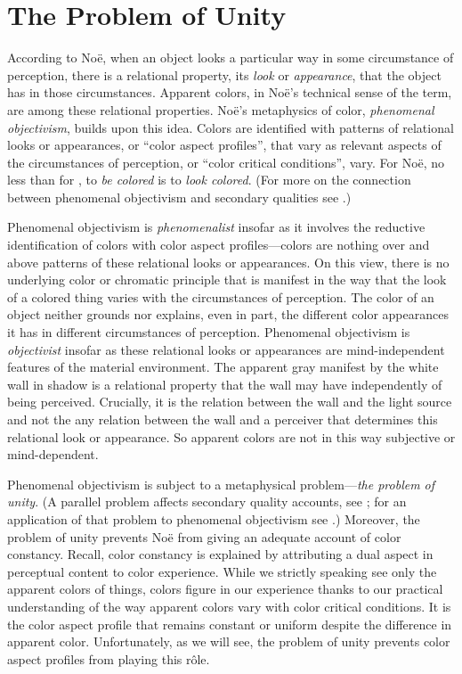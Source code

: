\documentclass[12pt]{article}
\begin{document}
\section{The Problem of Unity} %
\label{sec:the_problem_of_unity}

According to Noë, when an object looks a particular way in some circumstance of perception, there is a relational property, its \emph{look} or \emph{appearance}, that the object has in those circumstances. Apparent colors, in Noë's technical sense of the term, are among these relational properties. Noë's metaphysics of color, \emph{phenomenal objectivism}, builds upon this idea. Colors are identified with patterns of relational looks or appearances, or ``color aspect profiles'', that vary as relevant aspects of the circumstances of perception, or ``color critical conditions'', vary. For Noë, no less than for \citet{Locke:1706hc}, to \emph{be colored} is to \emph{look colored}. (For more on the connection between phenomenal objectivism and secondary qualities see \citealt{Allen:2008kx}.)

Phenomenal objectivism is \emph{phenomenalist} insofar as it involves the reductive identification of colors with color aspect profiles---colors are nothing over and above patterns of these relational looks or appearances. On this view, there is no underlying color or chromatic principle that is manifest in the way that the look of a colored thing varies with the circumstances of perception. The color of an object neither grounds nor explains, even in part, the different color appearances it has in different circumstances of perception. Phenomenal objectivism is \emph{objectivist} insofar as these relational looks or appearances are mind-independent features of the material environment. The apparent gray manifest by the white wall in shadow is a relational property that the wall may have independently of being perceived. Crucially, it is the relation between the wall and the light source and not the any relation between the wall and a perceiver that determines this relational look or appearance. So apparent colors are not in this way subjective or mind-dependent.

Phenomenal objectivism is subject to a metaphysical problem---\emph{the problem of unity}. (A parallel problem affects secondary quality accounts, see \citealt{Kalderon:2006fk}; for an application of that problem to phenomenal objectivism see \citealt{Allen:2008kx}.) Moreover, the problem of unity prevents Noë from giving an adequate account of color constancy. Recall, color constancy is explained by attributing a dual aspect in perceptual content to color experience. While we strictly speaking see only the apparent colors of things, colors figure in our experience thanks to our practical understanding of the way apparent colors vary with color critical conditions. It is the color aspect profile that remains constant or uniform despite the difference in apparent color. Unfortunately, as we will see, the problem of unity prevents color aspect profiles from playing this rôle.
\end{document}
